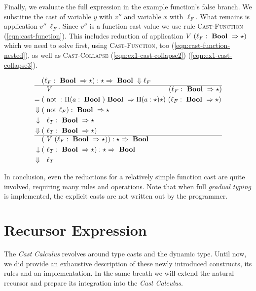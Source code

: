 Finally, we evaluate the full expression in the example function's false branch. We substitue the cast of variable $y$ with $v''$ and variable $x$ with $\ell_F$. What remains is application $v''~\ell_F$. Since $v''$ is a function cast value we use rule \textsc{Cast-Function} (\ref{eqn:cast-function}). This includes reduction of application $V~(\ell_F : \text{ \textbf{Bool} } \Rightarrow \star)$ which we need to solve first, using \textsc{Cast-Function}, too (\ref{eqn:cast-function-nested}), as well as \textsc{Cast-Collapse} (\ref{eqn:ex1-cast-collapse2}) (\ref{eqn:ex1-cast-collapse3}).

\begin{align}
(&\ell_F : \Bool \Rightarrow \star) : \star \Rightarrow \Bool \Downarrow \ell_F \label{eqn:ex1-cast-collapse2} \\ \hline
&~V~ \hspace{16.6em} (\ell_F : \Bool \Rightarrow \star) \\
= ( &\notf : \Pi(a:\Bool) \Bool \Rightarrow \Pi(a:\star) \star)~(\ell_F : \Bool \Rightarrow \star) \\
\Downarrow ( &\notf \ell_F ) : \Bool \Rightarrow \star \\
\downarrow ~~&~\ell_T : \Bool \Rightarrow \star \label{eqn:cast-function-nested} \\
\Downarrow (&~\ell_T : \Bool \Rightarrow \star) \\ \hline
( & ~V~(\ell_F : \Bool \Rightarrow \star)) : \star \Rightarrow \Bool \\
\downarrow (&~\ell_T : \Bool \Rightarrow \star) : \star \Rightarrow \Bool \label{eqn:cast-function} \\
\Downarrow ~~ & ~\ell_T \label{eqn:ex1-cast-collapse3}
\end{align}

In conclusion, even the reductions for a relatively simple function cast are quite involved, requiring many rules and operations. Note that when full \emph{gradual typing} is implemented, the explicit casts are not written out by the programmer.

\section{Recursor Expression}

The \emph{Cast Calculus} revolves around type casts and the dynamic type. Until now, we did provide an exhaustive description of these newly introduced constructs, its rules and an implementation. In the same breath we will extend the natural recursor and prepare its integration into the \emph{Cast Calculus}.


